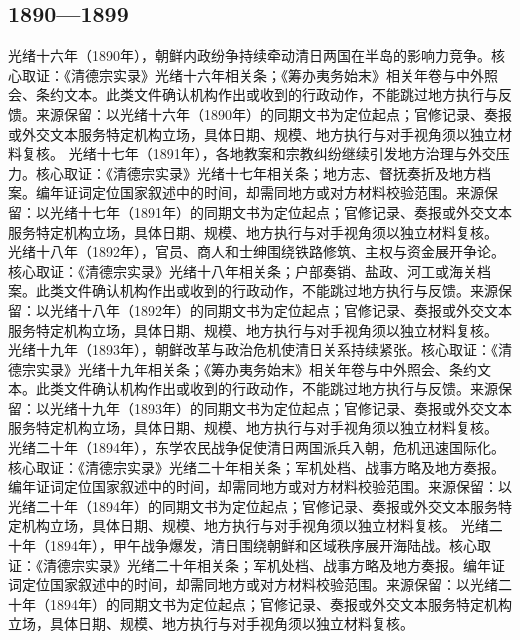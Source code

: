 \subsection{1890—1899}
光绪十六年（1890年），朝鲜内政纷争持续牵动清日两国在半岛的影响力竞争。核心取证：《清德宗实录》光绪十六年相关条；《筹办夷务始末》相关年卷与中外照会、条约文本。此类文件确认机构作出或收到的行政动作，不能跳过地方执行与反馈。来源保留：以光绪十六年（1890年）的同期文书为定位起点；官修记录、奏报或外交文本服务特定机构立场，具体日期、规模、地方执行与对手视角须以独立材料复核。
光绪十七年（1891年），各地教案和宗教纠纷继续引发地方治理与外交压力。核心取证：《清德宗实录》光绪十七年相关条；地方志、督抚奏折及地方档案。编年证词定位国家叙述中的时间，却需同地方或对方材料校验范围。来源保留：以光绪十七年（1891年）的同期文书为定位起点；官修记录、奏报或外交文本服务特定机构立场，具体日期、规模、地方执行与对手视角须以独立材料复核。
光绪十八年（1892年），官员、商人和士绅围绕铁路修筑、主权与资金展开争论。核心取证：《清德宗实录》光绪十八年相关条；户部奏销、盐政、河工或海关档案。此类文件确认机构作出或收到的行政动作，不能跳过地方执行与反馈。来源保留：以光绪十八年（1892年）的同期文书为定位起点；官修记录、奏报或外交文本服务特定机构立场，具体日期、规模、地方执行与对手视角须以独立材料复核。
光绪十九年（1893年），朝鲜改革与政治危机使清日关系持续紧张。核心取证：《清德宗实录》光绪十九年相关条；《筹办夷务始末》相关年卷与中外照会、条约文本。此类文件确认机构作出或收到的行政动作，不能跳过地方执行与反馈。来源保留：以光绪十九年（1893年）的同期文书为定位起点；官修记录、奏报或外交文本服务特定机构立场，具体日期、规模、地方执行与对手视角须以独立材料复核。
光绪二十年（1894年），东学农民战争促使清日两国派兵入朝，危机迅速国际化。核心取证：《清德宗实录》光绪二十年相关条；军机处档、战事方略及地方奏报。编年证词定位国家叙述中的时间，却需同地方或对方材料校验范围。来源保留：以光绪二十年（1894年）的同期文书为定位起点；官修记录、奏报或外交文本服务特定机构立场，具体日期、规模、地方执行与对手视角须以独立材料复核。
光绪二十年（1894年），甲午战争爆发，清日围绕朝鲜和区域秩序展开海陆战。核心取证：《清德宗实录》光绪二十年相关条；军机处档、战事方略及地方奏报。编年证词定位国家叙述中的时间，却需同地方或对方材料校验范围。来源保留：以光绪二十年（1894年）的同期文书为定位起点；官修记录、奏报或外交文本服务特定机构立场，具体日期、规模、地方执行与对手视角须以独立材料复核。
